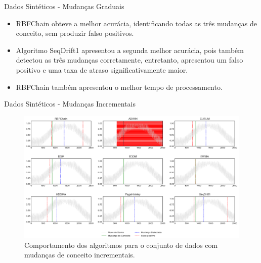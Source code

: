 \documentclass[10pt]{beamer}
\begin{document}
\begin{frame}{Dados Sintéticos -  Mudanças Graduais}
    \begin{itemize}
        \item RBFChain obteve a melhor acurácia, identificando todas as três mudanças de conceito, sem produzir falso positivos.
        \item Algoritmo SeqDrift1 apresentou a segunda melhor acurácia, pois também detectou as três mudanças corretamente, entretanto, apresentou um falso positivo e uma taxa de atraso significativamente maior.
        \item RBFChain também apresentou o melhor tempo de processamento.
    \end{itemize}
\end{frame}

\begin{frame}{Dados Sintéticos -  Mudanças Incrementais}
    \begin{figure}[t]
        \begin{center}
            \includegraphics[width=\textwidth]{imagens/incremental.png}
            \caption{Comportamento dos algoritmos para o conjunto de dados com mudanças de conceito incrementais.}
            \label{fig:exp_incremental}
        \end{center}
    \end{figure}
\end{frame}
\end{document}
